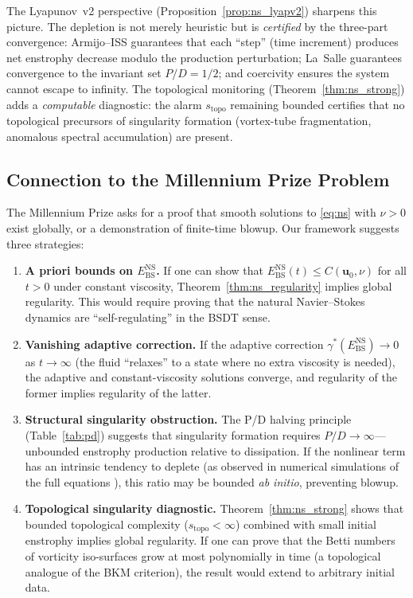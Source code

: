 \documentclass[final]{siamltex}
\newcommand{\Ebs}{E_{\mathrm{BS}}}
\begin{document}
The Lyapunov~v2 perspective (Proposition~\ref{prop:ns_lyapv2})
sharpens this picture.  The depletion is not merely heuristic but
is \emph{certified} by the three-part convergence: Armijo--ISS
guarantees that each ``step'' (time increment) produces net
enstrophy decrease modulo the production perturbation; La~Salle
guarantees convergence to the invariant set $P/D = 1/2$; and
coercivity ensures the system cannot escape to infinity.  The
topological monitoring (Theorem~\ref{thm:ns_strong}) adds a
\emph{computable} diagnostic: the alarm $s_{\mathrm{topo}}$
remaining bounded certifies that no topological precursors of
singularity formation (vortex-tube fragmentation, anomalous
spectral accumulation) are present.

\subsection{Connection to the Millennium Prize
Problem}\label{sec:ns:millennium}

The Millennium Prize \cite{fefferman2006} asks for a proof that
smooth solutions to \eqref{eq:ns} with $\nu>0$ exist globally, or
a demonstration of finite-time blowup. Our framework suggests three
strategies:
\begin{enumerate}
\item \textbf{A priori bounds on $\Ebs^{\mathrm{NS}}$.} If one
  can show that $\Ebs^{\mathrm{NS}}(t)\le C(\bm{u}_0,\nu)$ for
  all $t>0$ under constant viscosity, Theorem~\ref{thm:ns_regularity}
  implies global regularity. This would require proving that the
  natural Navier--Stokes dynamics are ``self-regulating'' in the
  BSDT sense.

\item \textbf{Vanishing adaptive correction.} If the adaptive
  correction $\gamma^*(\Ebs^{\mathrm{NS}})\to 0$ as $t\to\infty$
  (the fluid ``relaxes'' to a state where no extra viscosity is
  needed), the adaptive and constant-viscosity solutions converge,
  and regularity of the former implies regularity of the latter.

\item \textbf{Structural singularity obstruction.} The P/D halving
  principle (Table~\ref{tab:pd}) suggests that singularity
  formation requires $P/D\to\infty$---unbounded enstrophy
  production relative to dissipation. If the nonlinear term has an
  intrinsic tendency to deplete (as observed in numerical
  simulations of the full equations \cite{taylor1937}), this ratio
  may be bounded \emph{ab initio}, preventing blowup.

\item \textbf{Topological singularity diagnostic.}
  Theorem~\ref{thm:ns_strong} shows that bounded topological
  complexity ($s_{\mathrm{topo}} < \infty$) combined with
  small initial enstrophy implies global regularity.  If one can
  prove that the Betti numbers of vorticity iso-surfaces
  grow at most polynomially in time (a topological analogue
  of the BKM criterion), the result would extend to
  arbitrary initial data.
\end{enumerate}
\end{document}
